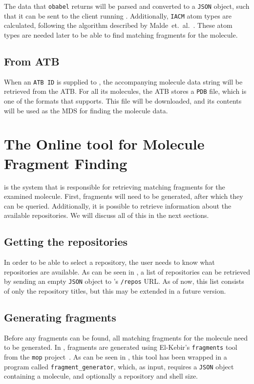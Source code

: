 The data that \verb|obabel| returns will be parsed and converted to a \verb|JSON| object, such that it can be sent to the client running \oframp. Additionally, \verb|IACM| atom types are calculated, following the algorithm described by Malde~et.~al.~\cite{malde2011automated}. These atom types are needed later to be able to find matching fragments for the molecule.


\subsection{From ATB}
When an \verb|ATB ID| is supplied to \oapoc, the accompanying molecule data string will be retrieved from the ATB. For all its molecules, the ATB stores a \verb|PDB| file, which is one of the formats that \oapoc{} supports. This file will be downloaded, and its contents will be used as the MDS for finding the molecule data.



\section[\omfraf]{The Online tool for Molecule Fragment Finding}
\omfraf{} is the system that is responsible for retrieving matching fragments for the examined molecule. First, fragments will need to be generated, after which they can be queried. Additionally, it is possible to retrieve information about the available repositories. We will discuss all of this in the next sections.

\subsection{Getting the repositories}
In order to be able to select a repository, the user needs to know what repositories are available. As can be seen in , a list of repositories can be retrieved by sending an empty \verb|JSON| object to \omfraf's \verb|/repos| URL. As of now, this list consists of only the repository titles, but this may be extended in a future version.

\subsection{Generating fragments}
Before any fragments can be found, all matching fragments for the molecule need to be generated. In \omfraf, fragments are generated using El-Kebir's \verb|fragments| tool from the \verb|mop| project~\cite{elkebir2014molecule}. As can be seen in , this tool has been wrapped in a program called \verb|fragment_generator|, which, as input, requires a \verb|JSON| object containing a molecule, and optionally a repository and shell size.


